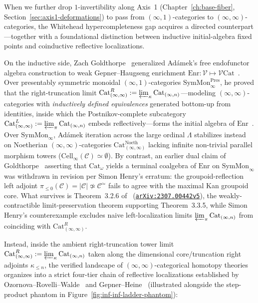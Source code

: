 \documentclass[10pt,twoside,openright]{book}
\theoremstyle{crmplain}
\theoremstyle{crmdef}
\theoremstyle{crmremark}
\begin{document}
When we further drop $1$-invertibility along Axis~1 (Chapter~\ref{ch:base-fiber}, Section~\ref{sec:axis1-deformations}) to pass from $(\infty, 1)$-categories to $(\infty, \infty)$-categories, the Whitehead hypercompleteness gap acquires a directed counterpart---together with a foundational distinction between inductive initial-algebra fixed points and coinductive reflective localizations.

On the inductive side, Zach Goldthorpe~\cite{Goldthorpe23} generalized Ad\'amek's free endofunctor algebra construction to weak Gepner--Haugseng enrichment $\mathrm{Enr}: \mathcal{V} \mapsto \mathcal{V}\mathrm{Cat}$~\cite{GepnerHaugseng15}. Over presentably symmetric monoidal $(\infty, 1)$-categories $\mathrm{SymMon}^{\mathrm{Pres}}_\infty$, he proved that the right-truncation limit $\mathrm{Cat}^R_{(\infty, \infty)} := \varprojlim_\kappa \mathrm{Cat}_{(\infty, n)}$---modeling $(\infty, \infty)$-categories with \emph{inductively defined equivalences} generated bottom-up from identities, inside which the Postnikov-complete subcategory $\mathrm{Cat}^L_{(\infty, \infty)} := \varprojlim_\pi \mathrm{Cat}_{(\infty, n)}$ embeds reflectively---forms the initial algebra of $\mathrm{Enr}$~\cite[Theorem~3.3.5]{Goldthorpe23}. Over $\mathrm{SymMon}_\infty$, Ad\'amek iteration across the large ordinal $\Lambda$ stabilizes instead on Noetherian $(\infty, \infty)$-categories $\mathrm{Cat}^{\mathrm{Noeth}}_{(\infty, \infty)}$ lacking infinite non-trivial parallel morphism towers ($\mathrm{Cell}_\infty(\mathcal{C}) \simeq \emptyset$). By contrast, an earlier dual claim of Goldthorpe~\cite{Goldthorpe23} asserting that $\mathrm{Cat}_\omega$ yields a terminal coalgebra of $\mathrm{Enr}$ on $\mathrm{SymMon}_\infty$ was withdrawn in revision per Simon Henry's erratum: the groupoid-reflection left adjoint $\pi_{\le 0}(\mathcal{C}) = |\mathcal{C}| \not\simeq \mathcal{C}^{\simeq}$ fails to agree with the maximal Kan groupoid core. What survives is Theorem~3.2.6 of~\cite{Goldthorpe23} (\href{https://arxiv.org/abs/2307.00442v5}{\texttt{arXiv:2307.00442v5}}), the weakly-contractible limit-preservation theorem supporting Theorem~3.3.5, while Simon Henry's counterexample excludes naive left-localization limits $\varprojlim_\pi \mathrm{Cat}_{(\infty, n)}$ from coinciding with $\mathrm{Cat}^R_{(\infty, \infty)}$.

Instead, inside the ambient right-truncation tower limit $\mathrm{Cat}^R_{(\infty, \infty)} := \varprojlim_\kappa \mathrm{Cat}_{(\infty, n)}$ taken along the dimensional core/truncation right adjoints $\kappa_{\le n}$, the verified landscape of $(\infty, \infty)$-categorical homotopy theories organizes into a strict four-tier chain of reflective localizations established by Ozornova--Rovelli--Walde~\cite[Thm.~4.25, \S 5]{ORW26} and Gepner--Heine~\cite{GepnerHeine26} (illustrated alongside the step-product phantom in Figure~\ref{fig:inf-inf-ladder-phantom}):
\end{document}
